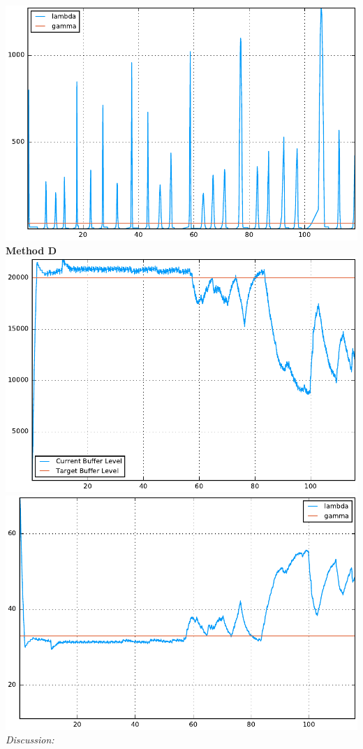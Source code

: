 \documentclass[12pt]{article}
\newenvironment{problem}[2][Problem]{\begin{trivlist}
\item[\hskip \labelsep {\bfseries #1}\hskip \labelsep {\bfseries #2.}]}{\end{trivlist}}
\begin{document}
\begin{problem}{1}
\includegraphics[scale = .5]{stream2.pdf}
\\
\textbf{Method D} \\
\includegraphics[scale = .5]{listen3.pdf}
\includegraphics[scale = .5]{stream3.pdf}
\\
\textit{Discussion:}

\end{problem}
\end{document}
